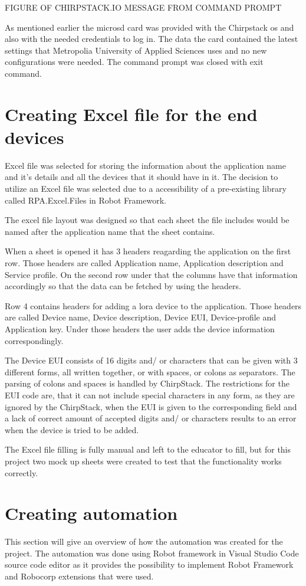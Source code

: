 FIGURE OF CHIRPSTACK.IO MESSAGE FROM COMMAND PROMPT

As mentioned earlier the micro\gls{sd} card was provided with the Chirpstack \gls{os} and also with the needed credentials to log in.
The data the card contained the latest settings that Metropolia University of Applied Sciences uses and no new configurations were needed.
The command prompt was closed with exit command.

\section{Creating Excel file for the end devices}
Excel file was selected for storing the information about the application name and it's details and all the devices that it should have in it.
The decision to utilize an Excel file was selected due to a accessibility of a pre-existing library called RPA.Excel.Files in Robot Framework.

The excel file layout was designed so that each sheet the file includes would be named after the application name that the sheet contains.

When a sheet is opened it has 3 headers reagarding the application on the first row.
Those headers are called Application name, Application description and Service profile.
On the second row under that the columns have that information accordingly so that the data can be fetched by using the headers.

Row 4 contains headers for adding a \gls{lora} device to the application.
Those headers are called Device name, Device description, Device EUI, Device-profile and Application key.
Under those headers the user adds the device information correspondingly.

The Device EUI consists of 16 digits and/ or characters that can be given with 3 different forms, all written together, or with spaces, or colons as separators.
The parsing of colons and spaces is handled by ChirpStack.
The restrictions for the EUI code are, that it can not include special characters in any form, as they are ignored by the ChirpStack, when the EUI is given to the corresponding field and a lack of correct amount of accepted digits and/ or characters results to an error when the device is tried to be added.

The Excel file filling is fully manual and left to the educator to fill, but for this project two mock up sheets were created to test that the functionality works correctly.

\section{Creating automation}
This section will give an overview of how the automation was created for the project.
The automation was done using Robot framework in Visual Studio Code source code editor as it provides the possibility to implement Robot Framework and Robocorp extensions that were used.

